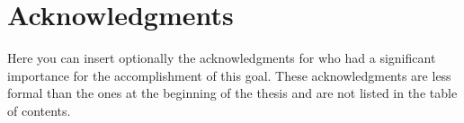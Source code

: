 \chapter*{Acknowledgments}
Here you can insert optionally the acknowledgments for who had a significant importance for the accomplishment of this goal. These acknowledgments are less formal than the ones at the beginning of the thesis and are not listed in the table of contents.